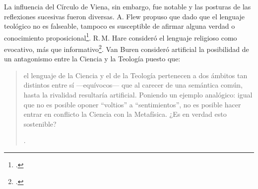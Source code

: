 
La influencia del Círculo de Viena, sin embargo, fue notable y las posturas de las reflexiones sucesivas fueron diversas. A. Flew propuso que dado que el lenguaje teológico no es falseable, tampoco es susceptible de afirmar alguna verdad o conocimiento proposicional\footcite[Cf.][27-30]{conesa1994cc}. R.\,M. Hare consideró el lenguaje religioso como evocativo, más que informativo\footcite[Cf.][35-36]{conesa1994cc}. Van Buren consideró artificial la posibilidad de un antagonismo entre la Ciencia y la Teología puesto que: \blockquote[{\Cite[156]{dominguez2009at}}.]{el lenguaje de la Ciencia y el de la Teología pertenecen a dos ámbitos tan distintos entre sí ---equívocos--- que al carecer de una semántica común, hasta la rivalidad resultaría artificial. Poniendo un ejemplo analógico: igual que no es posible oponer ``voltios'' a ``sentimientos'', no es posible hacer entrar en conflicto la Ciencia con la Metafísica. ¿Es en verdad esto sostenible?}

